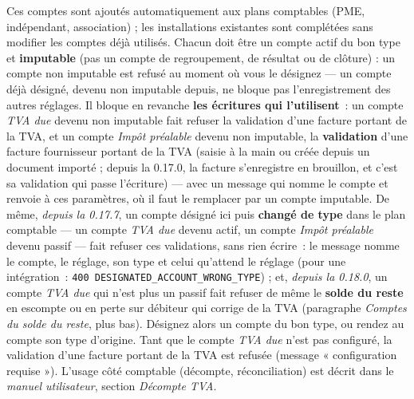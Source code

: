 \documentclass[a4paper,11pt,oneside]{article}
\begin{document}
Ces comptes sont ajoutés automatiquement aux plans comptables (PME, indépendant, association) ; les installations existantes sont complétées sans modifier les comptes déjà utilisés. Chacun doit être un compte actif du bon type et \textbf{imputable} (pas un compte de regroupement, de résultat ou de clôture) : un compte non imputable est refusé au moment où vous le désignez --- un compte déjà désigné, devenu non imputable depuis, ne bloque pas l'enregistrement des autres réglages. Il bloque en revanche \textbf{les écritures qui l'utilisent}~: un compte \emph{TVA due} devenu non imputable fait refuser la validation d'une facture portant de la TVA, et un compte \emph{Impôt préalable} devenu non imputable, la \textbf{validation} d'une facture fournisseur portant de la TVA (saisie à la main ou créée depuis un document importé ; depuis la 0.17.0, la facture s'enregistre en brouillon, et c'est sa validation qui passe l'écriture) --- avec un message qui nomme le compte et renvoie à ces paramètres, où il faut le remplacer par un compte imputable. De même, \emph{depuis la 0.17.7}, un compte désigné ici puis \textbf{changé de type} dans le plan comptable --- un compte \emph{TVA due} devenu actif, un compte \emph{Impôt préalable} devenu passif --- fait refuser ces validations, sans rien écrire~: le message nomme le compte, le réglage, son type et celui qu'attend le réglage (pour une intégration~: \texttt{400 DESIGNATED\_ACCOUNT\_WRONG\_TYPE}) ; et, \emph{depuis la 0.18.0}, un compte \emph{TVA due} qui n'est plus un passif fait refuser de même le \textbf{solde du reste} en escompte ou en perte sur débiteur qui corrige de la TVA (paragraphe \emph{Comptes du solde du reste}, plus bas). Désignez alors un compte du bon type, ou rendez au compte son type d'origine. Tant que le compte \emph{TVA due} n'est pas configuré, la validation d'une facture portant de la TVA est refusée (message « configuration requise »). L'usage côté comptable (décompte, réconciliation) est décrit dans le \emph{manuel utilisateur}, section \emph{Décompte TVA}.
\end{document}

